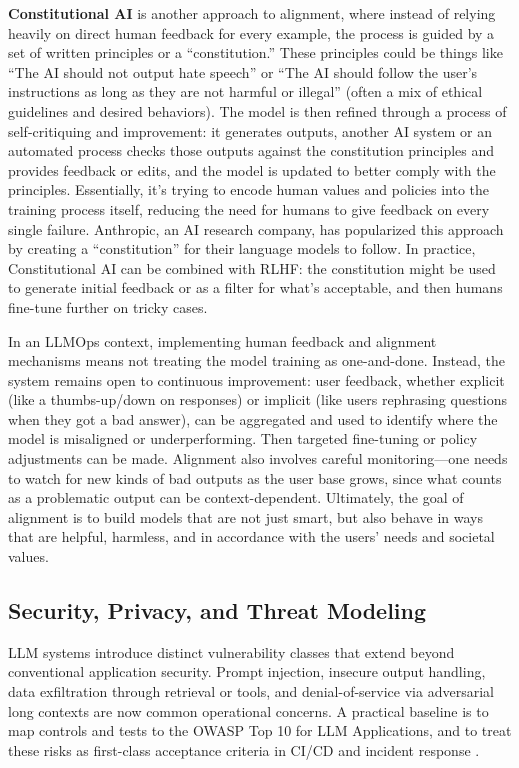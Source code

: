 \textbf{Constitutional AI} is another approach to alignment, where instead of relying heavily on direct human feedback for every example, the process is guided by a set of written principles or a “constitution.” These principles could be things like “The AI should not output hate speech” or “The AI should follow the user’s instructions as long as they are not harmful or illegal” (often a mix of ethical guidelines and desired behaviors). The model is then refined through a process of self-critiquing and improvement: it generates outputs, another AI system or an automated process checks those outputs against the constitution principles and provides feedback or edits, and the model is updated to better comply with the principles. Essentially, it’s trying to encode human values and policies into the training process itself, reducing the need for humans to give feedback on every single failure. Anthropic, an AI research company, has popularized this approach by creating a “constitution” for their language models to follow. In practice, Constitutional AI can be combined with RLHF: the constitution might be used to generate initial feedback or as a filter for what’s acceptable, and then humans fine-tune further on tricky cases. 

In an LLMOps context, implementing human feedback and alignment mechanisms means not treating the model training as one-and-done. Instead, the system remains open to continuous improvement: user feedback, whether explicit (like a thumbs-up/down on responses) or implicit (like users rephrasing questions when they got a bad answer), can be aggregated and used to identify where the model is misaligned or underperforming. Then targeted fine-tuning or policy adjustments can be made. Alignment also involves careful monitoring—one needs to watch for new kinds of bad outputs as the user base grows, since what counts as a problematic output can be context-dependent. Ultimately, the goal of alignment is to build models that are not just smart, but also behave in ways that are helpful, harmless, and in accordance with the users’ needs and societal values.


\subsection{Security, Privacy, and Threat Modeling}
\label{sec:ch2-security}
LLM systems introduce distinct vulnerability classes that extend beyond conventional application security.
Prompt injection, insecure output handling, data exfiltration through retrieval or tools, and denial-of-service
via adversarial long contexts are now common operational concerns. A practical baseline is to map controls
and tests to the OWASP Top 10 for LLM Applications, and to treat these risks as first-class acceptance criteria
in CI/CD and incident response \cite{OWASP2024LLMTop10}.

